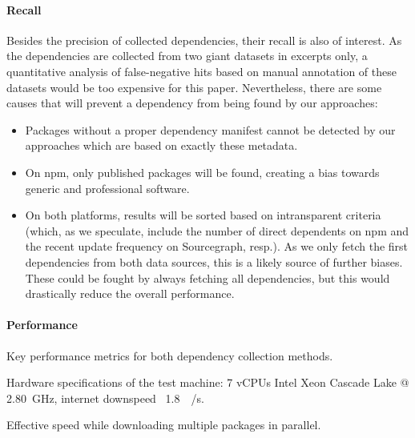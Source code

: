 \paragraph{Recall}
\label{sec:evaluation/resqu1/recall}

Besides the precision of collected dependencies, their recall is also of interest.
As the dependencies are collected from two giant datasets in excerpts only, a quantitative analysis of false-negative hits based on manual annotation of these datasets would be too expensive for this paper.
Nevertheless, there are some causes that will prevent a dependency from being found by our approaches:

\begin{itemize}
	\item Packages without a proper dependency manifest cannot be detected by our approaches which are based on exactly these metadata.
	\item On npm, only published packages will be found, creating a bias towards generic and professional software.
	\item On both platforms, results will be sorted based on intransparent criteria (which, as we speculate, include the number of direct dependents on npm and the recent update frequency on Sourcegraph, resp.).
		As we only fetch the first dependencies from both data sources, this is a likely source of further biases.
		These could be fought by always fetching all dependencies, but this would drastically reduce the overall performance.
\end{itemize}

\paragraph{Performance}
\label{sec:evaluation/resqu1/performance}

\begin{table}
	\caption{Key performance metrics for both dependency collection methods.}
	\label{tab:evaluation/resqu1/performance}

	\centering
	\begin{threeparttable}
		\renewcommand\theadfont{\normalsize}
		
		\begin{tablenotes}
			\footnotesize
			\item[\alphtnotetext{1}] Hardware specifications of the test machine: 7 vCPUs Intel Xeon Cascade Lake @ \SI{2.80}{\giga\hertz}, internet downspeed ~\SI{1.8}{\giga\bit/\second}.
			\item[\alphtnotetext{2}] Effective speed while downloading multiple packages in parallel.
		\end{tablenotes}
	\end{threeparttable}
\end{table}


